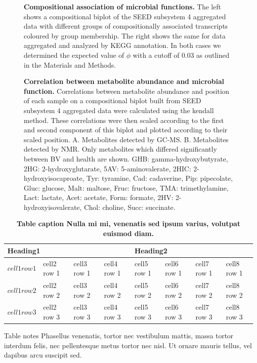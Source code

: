 \documentclass[10pt,letterpaper]{article}
\begin{document}
\begin{figure}[h]
\caption{{\bf Compositional association of microbial functions.}
The left shows a compositional biplot of the SEED subsystem 4 aggregated data with different groups of compositionally associated transcripts coloured by group membership. The right shows the same for data aggregated and analyzed by KEGG annotation. In both cases we determined the expected value of $\phi$ with a cutoff of 0.03 as outlined in the Materials and Methods. }
\label{F3:phi_biplot}
\end{figure}


\begin{figure}[h]
\caption{{\bf Correlation between metabolite abundance and microbial function.}
 Correlations between metabolite abundance and position of each sample on a compositional biplot built from SEED subsystem 4 aggregated data were calculated using the kendall method. These correlations were then scaled according to the first and second component of this biplot and plotted according to their scaled position. A. Metabolites detected by GC-MS. B. Metabolites detected by NMR. Only metabolites which differed significantly between BV and health are shown. GHB: gamma-hydroxybutyrate, 2HG: 2-hydroxyglutarate, 5AV: 5-aminovalerate, 2HIC: 2-hydroxyisocaproate, Tyr: tyramine, Cad: cadaverine, Pip: pipecolate, Gluc: glucose, Malt: maltose, Fruc: fructose, TMA: trimethylamine, Lact: lactate, Acet: acetate, Form: formate, 2HV: 2-hydroxyisovalerate, Chol: choline, Succ: succinate.}
\label{F5:metabolite_biplot}
\end{figure}


\begin{table}[!ht]
\begin{adjustwidth}{-2.25in}{0in} %
\caption{
{\bf Table caption Nulla mi mi, venenatis sed ipsum varius, volutpat euismod diam.}}
\begin{tabular}{|l|l|l|l|l|l|l|l|}
\hline
\multicolumn{4}{|l|}{\bf Heading1} & \multicolumn{4}{|l|}{\bf Heading2}\\ \hline
$cell1 row1$ & cell2 row 1 & cell3 row 1 & cell4 row 1 & cell5 row 1 & cell6 row 1 & cell7 row 1 & cell8 row 1\\ \hline
$cell1 row2$ & cell2 row 2 & cell3 row 2 & cell4 row 2 & cell5 row 2 & cell6 row 2 & cell7 row 2 & cell8 row 2\\ \hline
$cell1 row3$ & cell2 row 3 & cell3 row 3 & cell4 row 3 & cell5 row 3 & cell6 row 3 & cell7 row 3 & cell8 row 3\\ \hline
\end{tabular}
\begin{flushleft} Table notes Phasellus venenatis, tortor nec vestibulum mattis, massa tortor interdum felis, nec pellentesque metus tortor nec nisl. Ut ornare mauris tellus, vel dapibus arcu suscipit sed.
\end{flushleft}
\label{table1}
\end{adjustwidth}
\end{table}
\end{document}
